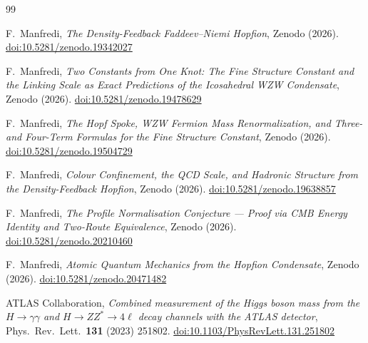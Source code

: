 \documentclass[11pt,a4paper]{article}
\theoremstyle{definition}
\theoremstyle{remark}
\begin{document}
\begin{thebibliography}{99}

F.~Manfredi,
\textit{The Density-Feedback Faddeev--Niemi Hopfion},
Zenodo (2026).
\href{https://doi.org/10.5281/zenodo.19342027}{doi:10.5281/zenodo.19342027}

F.~Manfredi,
\textit{Two Constants from One Knot: The Fine Structure Constant and
  the Linking Scale as Exact Predictions of the Icosahedral WZW Condensate},
Zenodo (2026).
\href{https://doi.org/10.5281/zenodo.19478629}{doi:10.5281/zenodo.19478629}

F.~Manfredi,
\textit{The Hopf Spoke, WZW Fermion Mass Renormalization, and
  Three- and Four-Term Formulas for the Fine Structure Constant},
Zenodo (2026).
\href{https://doi.org/10.5281/zenodo.19504729}{doi:10.5281/zenodo.19504729}

F.~Manfredi,
\textit{Colour Confinement, the QCD Scale, and Hadronic Structure
  from the Density-Feedback Hopfion},
Zenodo (2026).
\href{https://doi.org/10.5281/zenodo.19638857}{doi:10.5281/zenodo.19638857}

F.~Manfredi,
\textit{The Profile Normalisation Conjecture ---
  Proof via CMB Energy Identity and Two-Route Equivalence},
Zenodo (2026).
\href{https://doi.org/10.5281/zenodo.20210460}{doi:10.5281/zenodo.20210460}

F.~Manfredi,
\textit{Atomic Quantum Mechanics from the Hopfion Condensate},
Zenodo (2026).
\href{https://doi.org/10.5281/zenodo.20471482}{doi:10.5281/zenodo.20471482}

ATLAS Collaboration,
\textit{Combined measurement of the Higgs boson mass from the
$H\to\gamma\gamma$ and $H\to ZZ^*\to4\ell$ decay channels with
the ATLAS detector},
Phys.\ Rev.\ Lett.\ \textbf{131} (2023) 251802.
\href{https://doi.org/10.1103/PhysRevLett.131.251802}{doi:10.1103/PhysRevLett.131.251802}

\end{thebibliography}
\end{document}
